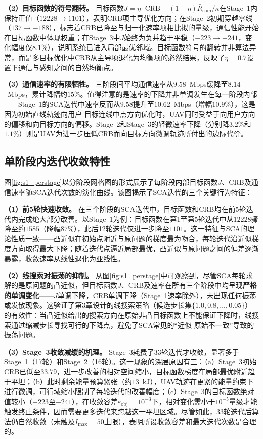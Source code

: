 \textbf{（2）目标函数的符号翻转。}
目标函数$J=\eta\cdot\text{CRB}-(1-\eta)\bar{R}_{\text{com}}/\kappa$在Stage~1内保持正值（$12228\rightarrow1101$），表明CRB项主导优化方向；在Stage~2初期穿越零线（$137\rightarrow-188$），标志着CRB已降至与归一化速率项相比拟的量级，通信性能开始在目标函数中体现权重；在Stage~3中$J$始终为负并趋于平稳（$-223\rightarrow-241$，变化幅度仅$8.1\%$），说明系统已进入局部最优邻域。目标函数符号的翻转并非算法异常，而是多目标优化中CRB从主导项退化为均衡项的必然结果，反映了$\eta=0.7$设置下通信与感知之间的自然均衡点。

\textbf{（3）通信速率的有限牺牲。}
三阶段间平均通信速率从$9.58$~Mbps缓降至$8.14$~Mbps，累计降幅约$15\%$。值得注意的是速率的下降并非单调发生在每一阶段内部——Stage~1的SCA迭代中速率反而从$9.58$提升至$10.62$~Mbps（增幅$10.9\%$），这是因为初始直线轨迹向用户-目标连线中点方向优化时，UAV同时受益于向用户方向的偏移和向目标方向的偏移。Stage~2和Stage~3的轻微速率下降（分别降$3.2\%$和$1.1\%$）则是UAV为进一步压低CRB而向目标方向微调轨迹所付出的边际代价。

\subsection{单阶段内迭代收敛特性}

图\ref{fig:s1_perstage}以分阶段网格图的形式展示了每阶段内部目标函数$J$、CRB及通信速率随SCA迭代次数的演化曲线。该图揭示了SCA迭代的三个关键行为特征：

\textbf{（1）前5轮快速收敛。}
在三个阶段的SCA迭代中，目标函数和CRB均在前5轮迭代内完成绝大部分改善。以Stage~1为例：目标函数在第1至第5轮迭代中从$12228$骤降至约$1585$（降幅$87\%$），此后12轮迭代仅进一步降至$1101$。这一特征与SCA的理论性质一致——凸近似在初始点附近与原问题的梯度最为吻合，每轮迭代沿近似梯度方向取得最大下降；随着迭代点逼近局部最优，凸近似与原问题之间的偏差逐渐暴露，收敛速率从线性退化为亚线性。

\textbf{（2）线搜索对振荡的抑制。}
从图\ref{fig:s1_perstage}中可观察到，尽管SCA每轮求解的是原问题的凸近似，但目标函数$J$、CRB及速率在所有三个阶段中均呈现\textbf{严格的单调变化}——$J$单调下降，CRB单调下降（Stage~1速率除外），未出现任何振荡或发散现象。这验证了第3章设计的线搜索策略（候选步长集$\{1.0,0.8,\dots,0.05\}$）的有效性：当凸近似给出的搜索方向在原始非凸目标函数上不能保证下降时，线搜索通过缩减步长寻找可行的下降点，避免了SCA常见的“近似-原始不一致”导致的振荡问题。

\textbf{（3）Stage~3收敛减缓的机理。}
Stage~3耗费了33轮迭代才收敛，显著多于Stage~1（17轮）和Stage~2（16轮）。这一现象的深层原因有三：（a）Stage~3初始CRB已低至$33.79$，进一步改善的相对空间缩小，目标函数梯度在局部最优附近趋于平坦；（b）此时剩余能量预算紧张（约$13$~kJ），UAV轨迹在更紧的能量约束下进行微调，可行域缩小限制了每轮迭代的改善幅度；（c）Stage~3的目标函数绝对值较小（$-223$至$-241$），在收敛容差$\varepsilon_{\text{obj}}=10^{-3}$下，相对变化需小于$10^{-5}$量级才能触发终止条件，因而需要更多迭代来跨越这一平坦区域。尽管如此，33轮迭代后算法仍自然收敛（未触及$I_{\max}=50$上限），表明所设收敛容差和最大迭代次数是合理的。

